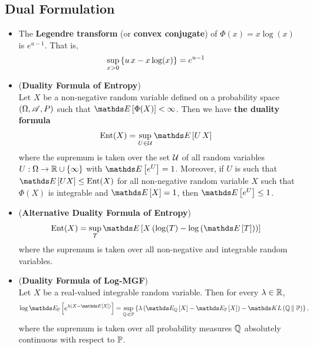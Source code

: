 \documentclass[11pt]{article}
\begin{document}
\subsection{Dual Formulation}
\begin{itemize}
\item \begin{lemma}
The \textbf{Legendre transform} (or \textbf{convex conjugate}) of $\Phi(x) = x\log(x)$ is $e^{u-1}$. That is,
\begin{align*}
\sup_{x > 0}\left\{u\,x - x\log(x)\right\} &= e^{u-1}
\end{align*}
\end{lemma}

\item \begin{proposition}(\textbf{Duality Formula of Entropy}) \citep{boucheron2013concentration}\\
Let $X$ be a non-negative random variable defined on a probability space $(\Omega, {\mathscr A}, P)$ such that $\E{}{\Phi(X)} < \infty$. Then we have \textbf{the duality formula}
\begin{align}
\text{Ent}(X) &= \sup_{U \in \cU}\E{}{U\,X}  \label{eqn: duality_entropy}
\end{align} where the supremum is taken over the set ${\mathcal U}$ of all random variables $U: \Omega \to {\mathbb R} \cup \left\{\infty\right\}$ with $\E{}{e^{U}} = 1$. Moreover, if $U$ is such that $\E{}{U X} \le \text{Ent}(X)$ for all non-negative random variable $X$ such that $\Phi(X)$ is integrable and $\E{}{X} = 1$, then $\E{}{e^{U}} \le 1$. 
\end{proposition}

\item  \begin{corollary} \label{thm: duality_entropy_2}(\textbf{Alternative Duality Formula of Entropy}) \citep{boucheron2013concentration}
\begin{align}
\text{Ent}(X) &= \sup_{T}\E{}{X\paren{\log(T) - \log\paren{\E{}{T}}}}  \label{eqn: duality_entropy_2}
\end{align} where the supremum is taken over all non-negative and integrable random variables.
\end{corollary}

\item \begin{corollary} \label{coro: dual_log_mgf}  (\textbf{Duality Formula of Log-MGF}) \citep{thomas2006elements, boucheron2013concentration}\\
Let $X$ be a real-valued integrable random variable. Then for every $\lambda \in {\mathbb R}$, 
\begin{align}
\log \E{\bP}{e^{\lambda\paren{X - \E{}{X}}}} &= \sup_{\bQ \ll \bP}\set{\lambda\paren{\E{\bQ}{X} - \E{\bP}{X}} - \kl{\bQ}{\bP} }, \label{eqn: duality_log_mgf}
\end{align} where the supremum is taken over all probability measures ${\mathbb Q}$ absolutely continuous with respect to ${\mathbb P}$.
\end{corollary}


\end{itemize}
\end{document}
